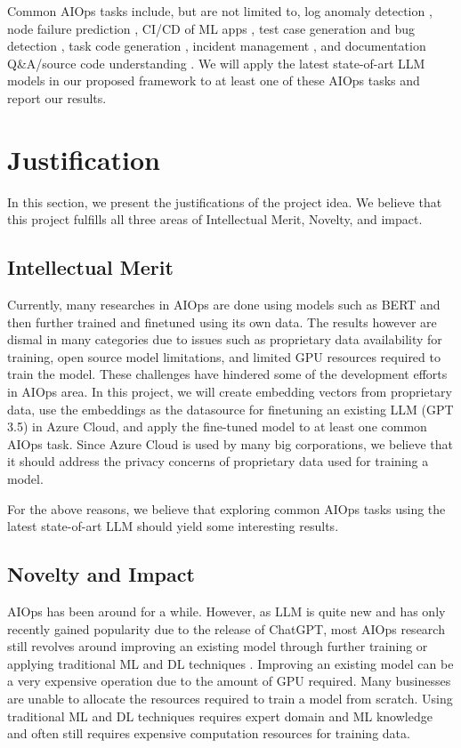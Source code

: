 \documentclass[conference]{IEEEtran}
\begin{document}
Common AIOps tasks include, but are not limited to, log anomaly detection \cite{network-log-anomaly-detection}, node failure prediction \cite{aiops-node-failures-alibaba}, CI/CD of ML apps \cite{mlops-ossara}, test case generation and bug detection \cite{model-checking-guided-testing}, task code generation \cite{mani2023enhancing}, incident management \cite{chen2020aiops, li2022an}, and documentation Q\&A/source code understanding \cite{source-code-understanding}. We will apply the latest state-of-art LLM models in our proposed framework to at least one of these AIOps tasks and report our results.


\section{Justification}
In this section, we present the justifications of the project idea. We believe that this project fulfills all three areas of Intellectual Merit, Novelty, and impact.

\subsection{Intellectual Merit}
Currently, many researches in AIOps are done using models such as BERT \cite{network-log-anomaly-detection} and then further trained and finetuned using its own data. The results however are dismal \cite{network-log-anomaly-detection} in many categories due to issues such as proprietary data availability for training, open source model limitations, and limited GPU resources required to train the model. These challenges have hindered some of the development efforts in AIOps area.
In this project, we will create embedding vectors from proprietary data, use the embeddings as the datasource for finetuning an existing LLM (GPT 3.5) in Azure Cloud, and apply the fine-tuned model to at least one common AIOps task.
Since Azure Cloud is used by many big corporations, we believe that it should address the privacy concerns of proprietary data used for training a model.

For the above reasons, we believe that exploring common AIOps tasks using the latest state-of-art LLM should yield some interesting results.

\subsection{Novelty and Impact}
AIOps has been around for a while. However, as LLM is quite new and has only recently gained popularity due to the release of ChatGPT, most AIOps research still revolves around improving an existing model through further training or applying traditional ML and DL techniques \cite{network-log-anomaly-detection}. Improving an existing model can be a very expensive operation due to the amount of GPU required. Many businesses are unable to allocate the resources required to train a model from scratch. Using traditional ML and DL techniques requires expert domain and ML knowledge and often still requires expensive computation resources for training data.
\end{document}
